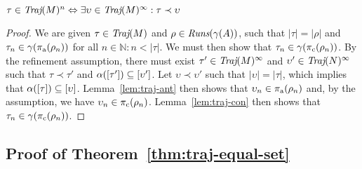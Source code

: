 \begin{lemma} \label{lem:traj-fin-inf}
$\tau \in \operatorname{\textit{Traj}}(M)^{n} \Leftrightarrow \exists \upsilon \in \operatorname{\textit{Traj}}(M)^{\infty} : \tau \prec \upsilon$
\end{lemma}
%

\begin{proof}
We are given $\tau \in \operatorname{\textit{Traj}}(M)$ and $\rho \in \operatorname{\textit{Runs}}(\gamma(A))$, such that $| \tau | = | \rho |$ and $\tau_{n} \in \gamma(\operatorname{\pi_{\textrm{a}}}(\rho_{n}))$ for all $n \in \mathbb{N} : n < | \tau |$. We must then show that $\tau_{n} \in \gamma(\operatorname{\pi_{\textrm{c}}}(\rho_{n}))$. By the refinement assumption, there must exist $\tau' \in \operatorname{\textit{Traj}}(M)^{\infty}$ and $\upsilon' \in \operatorname{\textit{Traj}}(N)^{\infty}$ such that $\tau \prec \tau'$ and $\alpha([\tau']) \subseteq [\upsilon']$. Let $\upsilon \prec \upsilon'$ such that $| \upsilon | = | \tau |$, which implies that $\alpha([\tau]) \subseteq [\upsilon]$. Lemma~\ref{lem:traj-ant} then shows that $\upsilon_{n} \in \operatorname{\pi_{\textrm{a}}}(\rho_{n})$ and, by the assumption, we have $\upsilon_{n} \in \operatorname{\pi_{\textrm{c}}}(\rho_{n})$. Lemma~\ref{lem:traj-con} then shows that $\tau_{n} \in \gamma(\operatorname{\pi_{\textrm{c}}}(\rho_{n}))$.
\end{proof}

\subsection{Proof of Theorem~\ref{thm:traj-equal-set}}

